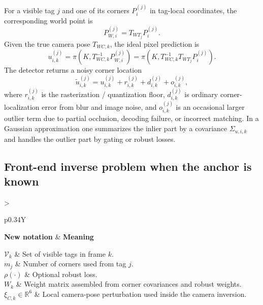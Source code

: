 \documentclass[11pt]{report}
\newcommand{\R}{\mathbb{R}}
\newcommand{\NotationTable}[1]{%
\vspace{0.6mm}
{\scriptsize
\setlength{\tabcolsep}{2.5pt}
\begin{tabularx}{\columnwidth}{>{\raggedright\arraybackslash}p{0.34\columnwidth}Y}
\toprule
\textbf{New notation} & \textbf{Meaning}\\
\midrule
#1\\
\bottomrule
\end{tabularx}}
\vspace{0.8mm}}
\begin{document}
For a visible tag $j$ and one of its corners $P_i^{(j)}$ in tag-local coordinates, the corresponding world point is
\begin{equation}
P_{W,i}^{(j)} = T_{WT_j}P_i^{(j)}.
\end{equation}
Given the true camera pose $T_{WC,k}$, the ideal pixel prediction is
\begin{equation}
 u_{i,k}^{(j)} = \pi\!\left(K,T^{-1}_{WC,k}P_{W,i}^{(j)}\right)
 = \pi\!\left(K,T^{-1}_{WC,k}T_{WT_j}P_i^{(j)}\right).
\label{eq:ideal_projection_sweep}
\end{equation}
The detector returns a noisy corner location
\begin{equation}
\widetilde u_{i,k}^{(j)} = u_{i,k}^{(j)} + r_{i,k}^{(j)} + d_{i,k}^{(j)} + o_{i,k}^{(j)},
\label{eq:pixel_noise_model_sweep}
\end{equation}
where $r_{i,k}^{(j)}$ is the rasterization / quantization floor, $d_{i,k}^{(j)}$ is ordinary corner-localization error from blur and image noise, and $o_{i,k}^{(j)}$ is an occasional larger outlier term due to partial occlusion, decoding failure, or incorrect matching. In a Gaussian approximation one summarizes the inlier part by a covariance $\Sigma_{u,i,k}$ and handles the outlier part by gating or robust losses.

\subsection{Front-end inverse problem when the anchor is known}
\NotationTable{
$\mathcal V_k$ & Set of visible tags in frame $k$.\\
$m_j$ & Number of corners used from tag $j$.\\
$\rho(\cdot)$ & Optional robust loss.\\
$W_k$ & Weight matrix assembled from corner covariances and robust weights.\\
$\xi_{C,k}\in\R^6$ & Local camera-pose perturbation used inside the camera inversion.}
\end{document}
